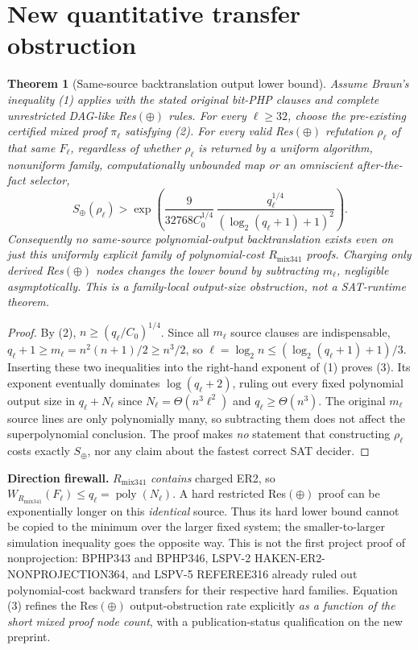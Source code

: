 \documentclass[11pt]{article}
\newtheorem{theorem}{Theorem}
\begin{document}
\section*{New quantitative transfer obstruction}
\begin{theorem}[Same-source backtranslation output lower bound]
Assume Braun's inequality (1) applies with the stated original bit-PHP clauses and complete unrestricted DAG-like Res$(\oplus)$ rules. For every $\ell\ge32$, choose the pre-existing certified mixed proof $\pi_\ell$ satisfying (2). For \emph{every} valid Res$(\oplus)$ refutation $\rho_\ell$ of that same $F_\ell$, regardless of whether $\rho_\ell$ is returned by a uniform algorithm, nonuniform family, computationally unbounded map or an omniscient after-the-fact selector,
\[
 S_\oplus(\rho_\ell)>
 \exp\!\left(\frac{9}{32768 C_0^{1/4}}\,
 \frac{q_\ell^{1/4}}{(\log_2(q_\ell+1)+1)^2}\right).
 \tag{3}
\]
Consequently \emph{no} same-source polynomial-output backtranslation exists even on just this uniformly explicit family of polynomial-cost $R_{\mathrm{mix341}}$ proofs. Charging only derived Res$(\oplus)$ nodes changes the lower bound by subtracting $m_\ell$, negligible asymptotically. This is a \emph{family-local output-size obstruction}, not a SAT-runtime theorem.
\end{theorem}
\begin{proof}
By (2), $n\ge(q_\ell/C_0)^{1/4}$. Since all $m_\ell$ source clauses are indispensable,
$q_\ell+1\ge m_\ell=n^2(n+1)/2\ge n^3/2$, so
$\ell=\log_2 n\le(\log_2(q_\ell+1)+1)/3$.
Inserting these two inequalities into the right-hand exponent of (1) proves (3). Its exponent eventually dominates $\log(q_\ell+2)$, ruling out every fixed polynomial output size in $q_\ell+N_\ell$ since $N_\ell=\Theta(n^3\ell^2)$ and $q_\ell\ge\Theta(n^3)$. The original $m_\ell$ source lines are only polynomially many, so subtracting them does not affect the superpolynomial conclusion. The proof makes \emph{no} statement that constructing $\rho_\ell$ costs exactly $S_\oplus$, nor any claim about the fastest correct SAT decider.
\end{proof}

\noindent\textbf{Direction firewall.} $R_{\mathrm{mix341}}$ \emph{contains} charged ER2, so $W_{R_{\mathrm{mix341}}}(F_\ell)\le q_\ell=\operatorname{poly}(N_\ell)$. A hard restricted Res$(\oplus)$ proof can be exponentially longer on this \emph{identical} source. Thus its hard lower bound cannot be copied to the minimum over the larger fixed system; the smaller-to-larger simulation inequality goes the opposite way. This is not the first project proof of nonprojection: BPHP343 and BPHP346, LSPV-2 HAKEN-ER2-NONPROJECTION364, and LSPV-5 REFEREE316 already ruled out polynomial-cost backward transfers for their respective hard families. Equation (3) refines the Res$(\oplus)$ output-obstruction rate explicitly \emph{as a function of the short mixed proof node count}, with a publication-status qualification on the new preprint.
\end{document}
